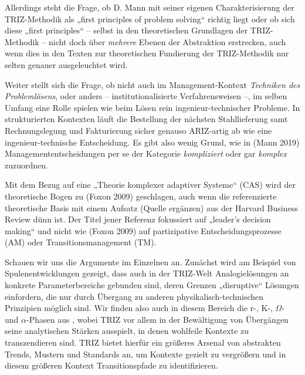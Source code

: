 \documentclass[11pt,a4paper]{article}
\begin{document}
Allerdings steht die Frage, ob D. Mann mit seiner eigenen Charakterisierung
der TRIZ-Methodik als „first principles of problem solving“ richtig liegt oder
ob sich diese „first principles“ -- selbst in den theoretischen Grundlagen der
TRIZ-Methodik -- nicht doch über \emph{mehrere} Ebenen der Abstraktion
erstrecken, auch wenn dies in den Texten zur theoretischen Fundierung der
TRIZ-Methodik nur selten genauer ausgeleuchtet wird.

Weiter stellt sich die Frage, ob nicht auch im Management-Kontext
\emph{Techniken des Problemlösens}, oder anders -- institutionalisierte
Verfahrensweisen --, im selben Umfang eine Rolle spielen wie beim Lösen rein
ingenieur-technischer Probleme. In strukturierten Kontexten läuft die
Bestellung der nächsten Stahllieferung samt Rechnungslegung und Fakturierung
sicher genauso ARIZ-artig ab wie eine ingenieur-technische Entscheidung. Es
gibt also wenig Grund, wie in (Mann 2019) Managemententscheidungen per se der
Kategorie \emph{kompliziert} oder gar \emph{komplex} zuzuordnen.

Mit dem Bezug auf eine „Theorie komplexer adaptiver Systeme“ (CAS) wird der
theoretische Bogen zu (Foxon 2009) geschlagen, auch wenn die referenzierte
theoretische Basis mit einem {Aufsatz} (Quelle ergänzen) aus der Harvard
Business Review dünn ist. Der Titel jener Referenz fokussiert auf „leader's
decision making“ und nicht wie (Foxon 2009) auf partizipative
Entscheidungsprozesse (AM) oder Transitionsmanagement (TM).

Schauen wir uns die Argumente im Einzelnen an. Zunächst wird am Beispiel von
Spulenentwicklungen gezeigt, dass auch in der TRIZ-Welt Analogielösungen an
konkrete Parameterbereiche gebunden sind, deren Grenzen „disruptive“ Lösungen
einfordern, die nur durch Übergang zu anderen physikalisch-technischen
Prinzipien möglich sind. Wir finden also auch in diesem Bereich die r-, K-,
$\Omega$- und $\alpha$-Phasen aus \cite{Holling2000}, wobei TRIZ vor allem in der
Bewältigung von Übergängen seine analytischen Stärken ausspielt, in denen
wohlfeile Kontexte zu transzendieren sind. TRIZ bietet hierfür ein größeres
Arsenal von abstrakten Trends, Mustern und Standards an, um Kontexte gezielt
zu vergrößern und in diesem größeren Kontext Transitionspfade zu
identifizieren.
\end{document}
